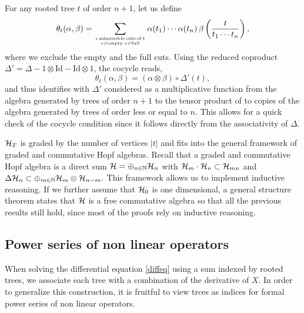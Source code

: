 \documentclass[10pt,here,feynmf]{article}
\begin{document}
For any rooted tree $t$ of order $n+1$, let us define
\begin{equation}
\theta_{t}(\alpha,\beta)=\sum_{c\,\mathrm{admissible \,cuts\, of\,}t\atop c\neq\mathrm{empty}\;c\neq\mathrm{full}
}\alpha(t_{1})\cdots\alpha(t_{n})
\,\beta\left(\frac{t}{t_{1}\cdots t_{n}}\right),
\end{equation}
where we exclude the empty and the full cuts. Using the reduced coproduct $\Delta'=\Delta-1\otimes\mathrm{Id}-\mathrm{Id}\otimes 1$, the cocycle reads, 
\begin{equation}
\theta_{t}(\alpha,\beta)=\left(\alpha\otimes\beta\right)\circ\Delta' (t),
\end{equation}
and thus identifies with $\Delta'$ considered as a multiplicative function from the algebra generated by trees of order $n+1$ to the tensor product of to copies of the algebra generated by trees of order less or equal to $n$. This allows for a quick check of the cocycle condition since it follows directly from the associativity of $\Delta$. 

${\cal H}_{T}$ is graded by the number of vertices $|t|$ and fits into the general framework of graded and commutative Hopf algebras. Recall that a graded and commutative Hopf algebra is a direct sum ${\cal H}=\oplus_{n\in{\Bbb N}}{\cal H}_{n}$ with
 $
{\cal H}_{m}\cdot {\cal H}_{n}\subset{\cal H}_{mn}
$
and
$
\Delta {\cal H}_{n}\subset\oplus_{m\in{\Bbb N}}{\cal H}_{m}\otimes{\cal H}_{n-m}.
$
This framework allows us to implement inductive reasoning.  If we further assume that ${\cal H}_{0}$ is one dimensional, a general structure theorem \cite{cartier} states that ${\cal H}$ is a free commutative algebra so that all the previous results still hold, since most of the proofs rely on inductive reasoning.  


\subsection{Power series of non linear operators}


When solving the differential equation \eqref{diffeq} using a sum indexed by rooted trees, we associate each tree with a combination of the derivative of $X$. In order to generalize this construction, it is fruitful to view trces as indices for formal power series of non linear operators. 
\end{document}
